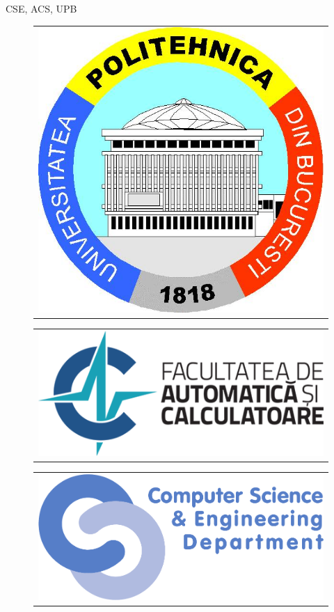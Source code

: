 \documentclass{paper}
\begin{document}
\begin{frame}{CSE, ACS, UPB}
  \begin{figure}
    \begin{minipage}[b]{0.3\linewidth}
      \centering
      \begin{tabular}{c}
        \includegraphics[width=0.7\linewidth]{img/UPB-logo} \\
      \end{tabular}
    \end{minipage}
    \hspace{0.3cm}
    \begin{minipage}[b]{0.3\linewidth}
      \begin{tabular}{c}
        \includegraphics[width=0.7\linewidth]{img/ACS-logo} \\
      \end{tabular}
    \end{minipage}
    \hspace{0.3cm}
    \begin{minipage}[b]{0.3\linewidth}
      \begin{tabular}{c}
        \includegraphics[width=0.7\linewidth]{img/CSE-logo} \\
      \end{tabular}
    \end{minipage}
  \end{figure}
\end{frame}
\end{document}
